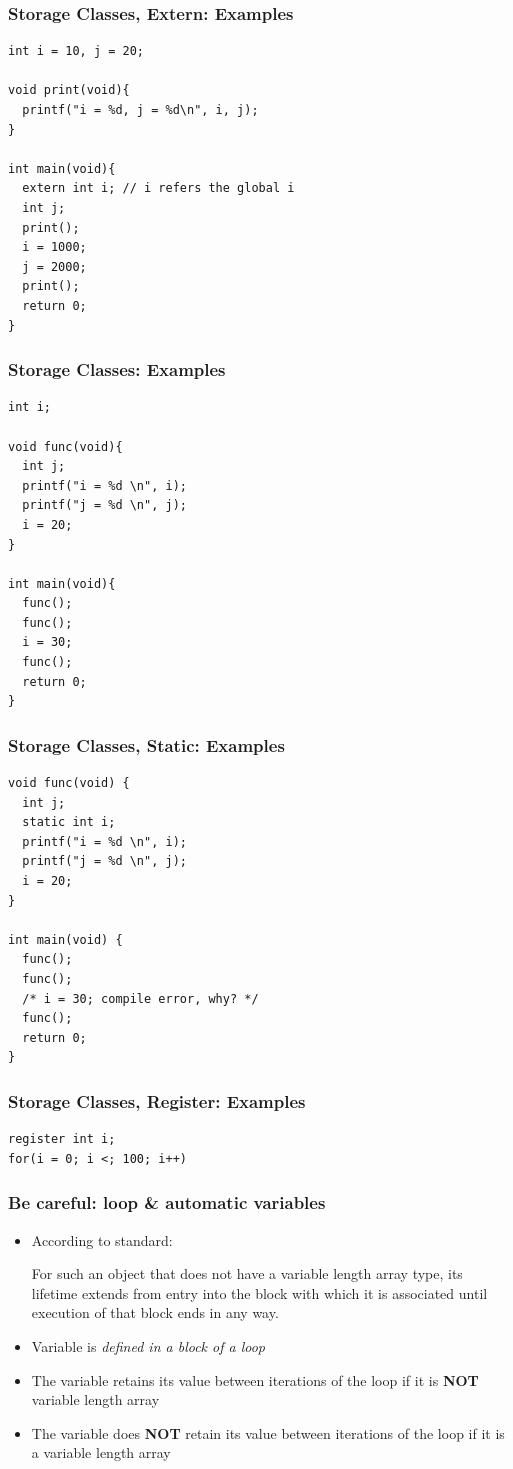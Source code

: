 \documentclass{../c-lecture}
\begin{document}
\begin{frame}[fragile]
  \frametitle{Storage Classes, Extern: Examples}
  \begin{verbatim}
int i = 10, j = 20;

void print(void){
  printf("i = %d, j = %d\n", i, j);
}

int main(void){
  extern int i; // i refers the global i
  int j;
  print();
  i = 1000;
  j = 2000;
  print();
  return 0;
}
  \end{verbatim}
\end{frame}

\begin{frame}[fragile]
  \frametitle{Storage Classes: Examples}
  \begin{verbatim}
int i;

void func(void){
  int j;
  printf("i = %d \n", i);
  printf("j = %d \n", j);
  i = 20;
}

int main(void){
  func();
  func();
  i = 30;
  func();
  return 0;
}
  \end{verbatim}
\end{frame}

\begin{frame}[fragile]
  \frametitle{Storage Classes, Static: Examples}
  \begin{verbatim}
void func(void) {
  int j;
  static int i;
  printf("i = %d \n", i);
  printf("j = %d \n", j);
  i = 20;
}

int main(void) {
  func();
  func();
  /* i = 30; compile error, why? */
  func();
  return 0;
}
  \end{verbatim}
\end{frame}

\begin{frame}[fragile]
  \frametitle{Storage Classes, Register: Examples}
  \begin{verbatim}
register int i;
for(i = 0; i <; 100; i++)
  \end{verbatim}
\end{frame}

\begin{frame}
  \frametitle{Be careful: loop \& automatic variables}
  \begin{itemize}
    \item According to standard:
    \begin{block}{}
      For such an object that does not have a variable length array type, its
      lifetime extends from entry into the block with which it is associated
      until execution of that block ends in any way.
    \end{block}
    \item Variable is \textit{\color{Yellow} defined in a block of a loop}
    \item
      The variable retains its value between iterations of the loop if it is
      \textbf{\color{RubineRed} NOT} variable length array
    \item
      The variable does \textbf{\color{RubineRed} NOT} retain its value between
      iterations of the loop if it is a variable length array
  \end{itemize}
\end{frame}
\end{document}
